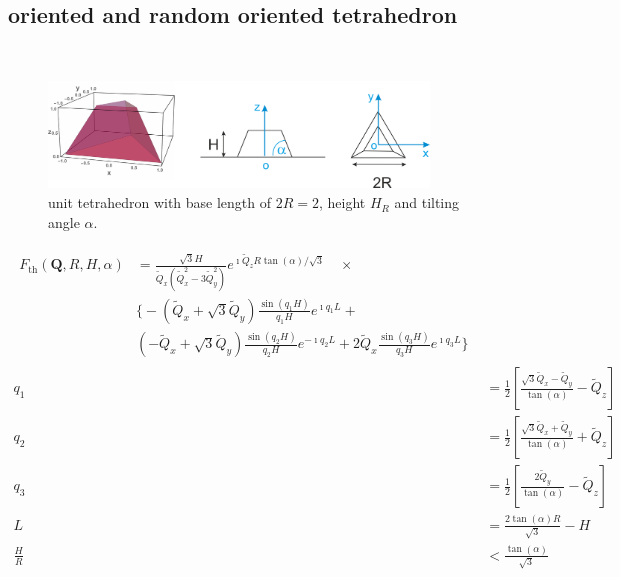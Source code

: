 \subsection{oriented and random oriented tetrahedron} ~\\
\cite{Renaud2009}
\begin{figure}[htb]
\begin{center}
\includegraphics[width=0.9\textwidth]{../images/form_factor/oriented_primitive_opbjects/tetrahedron.png}
\end{center}
\caption{unit tetrahedron with base length of $2R=2$, height $H_R$ and tilting angle $\alpha$.}
\label{fig:opo_tetrahedron}
\end{figure}


\begin{align}\label{eq:opo_tetrah}
\begin{split}
 F_\mathrm{th}(\mathbf{Q},R,H,\alpha) & = \frac{\sqrt{3}H}{\tilde{Q}_x\left(\tilde{Q}_x^2-3\tilde{Q}_y^2\right)} e^{\imath\tilde{Q}_zR\tan(\alpha)/\sqrt{3}} \quad \times\\
     &  \Bigg\{-\left(\tilde{Q}_x+\sqrt{3}\tilde{Q}_y\right) \frac{\sin(q_1H)}{q_1H}e^{\imath q_1L}  +\\
     & \left(-\tilde{Q}_x+\sqrt{3}\tilde{Q}_y\right)\frac{\sin(q_2H)}{q_2H}e^{-\imath q_2L} +2\tilde{Q}_x \frac{\sin(q_3H)}{q_3H}e^{\imath q_3L}\Bigg\}
\end{split} \\
  q_1 & =\frac12 \left[\frac{\sqrt{3}\tilde{Q}_x-\tilde{Q}_y}{\tan(\alpha)}-\tilde{Q}_z\right]\\
  q_2 & =\frac12 \left[\frac{\sqrt{3}\tilde{Q}_x+\tilde{Q}_y}{\tan(\alpha)}+\tilde{Q}_z\right]\\
  q_3 & =\frac12 \left[\frac{2\tilde{Q}_y}{\tan(\alpha)}-\tilde{Q}_z\right]\\
  L & =\frac{2\tan(\alpha)R}{\sqrt{3}}-H\\
  \frac{H}{R} & < \frac{\tan(\alpha)}{\sqrt{3}}
\end{align}

